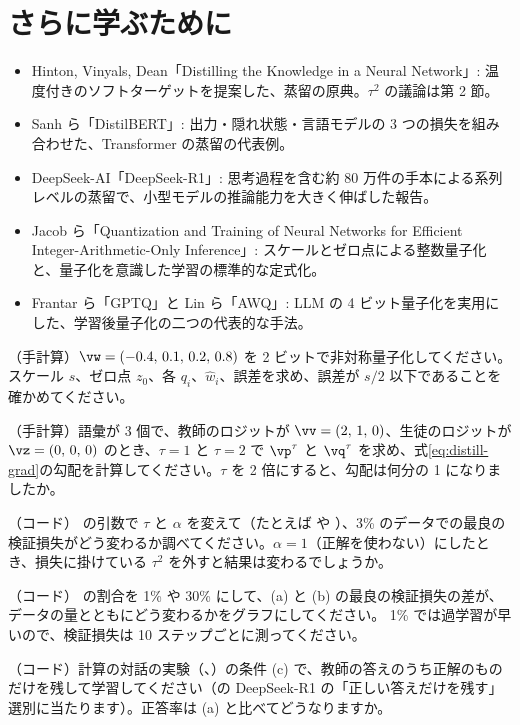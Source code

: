 \section*{さらに学ぶために}

\begin{itemize}
\item Hinton, Vinyals, Dean「Distilling the Knowledge in a Neural Network」\cite{hinton2015distilling}: 温度付きのソフトターゲットを提案した、蒸留の原典。$\tau^2$ の議論は第 2 節。
\item Sanh ら「DistilBERT」\cite{sanh2019distilbert}: 出力・隠れ状態・言語モデルの 3 つの損失を組み合わせた、Transformer の蒸留の代表例。
\item DeepSeek-AI「DeepSeek-R1」\cite{guo2025deepseekr1}: 思考過程を含む約 80 万件の手本による系列レベルの蒸留で、小型モデルの推論能力を大きく伸ばした報告。
\item Jacob ら「Quantization and Training of Neural Networks for Efficient Integer-Arithmetic-Only Inference」\cite{jacob2018quantization}: スケールとゼロ点による整数量子化と、量子化を意識した学習の標準的な定式化。
\item Frantar ら「GPTQ」\cite{frantar2023gptq}と Lin ら「AWQ」\cite{lin2024awq}: LLM の 4 ビット量子化を実用にした、学習後量子化の二つの代表的な手法。
\end{itemize}

\begin{exercises}
\item （手計算）$\vw=(-0.4,\,0.1,\,0.2,\,0.8)$ を 2 ビットで非対称量子化してください。スケール $s$、ゼロ点 $z_0$、各 $q_i$、$\hat w_i$、誤差を求め、誤差が $s/2$ 以下であることを確かめてください。
\item （手計算）語彙が 3 個で、教師のロジットが $\vv=(2,\,1,\,0)$、生徒のロジットが $\vz=(0,\,0,\,0)$ のとき、$\tau=1$ と $\tau=2$ で $\vp^\tau$ と $\vq^\tau$ を求め、式\eqref{eq:distill-grad}の勾配を計算してください。$\tau$ を 2 倍にすると、勾配は何分の 1 になりましたか。
\item （コード） の引数で $\tau$ と $\alpha$ を変えて（たとえば  や ）、3\% のデータでの最良の検証損失がどう変わるか調べてください。$\alpha=1$（正解を使わない）にしたとき、損失に掛けている $\tau^2$ を外すと結果は変わるでしょうか。
\item （コード） の割合を 1\% や 30\% にして、(a) と (b) の最良の検証損失の差が、データの量とともにどう変わるかをグラフにしてください。
1\% では過学習が早いので、検証損失は 10 ステップごとに測ってください。
\item （コード）計算の対話の実験（、）の条件 (c) で、教師の答えのうち正解のものだけを残して学習してください（の DeepSeek-R1 の「正しい答えだけを残す」選別に当たります）。正答率は (a) と比べてどうなりますか。
\end{exercises}
